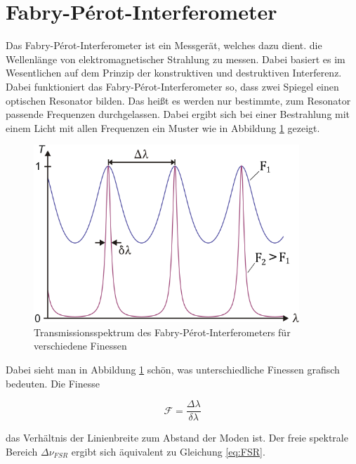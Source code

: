 \section{Fabry-Pérot-Interferometer}
\label{section:Fabry}

Das Fabry-Pérot-Interferometer ist ein Messgerät, welches dazu dient. die Wellenlänge 
von elektromagnetischer Strahlung zu messen. Dabei basiert es im Wesentlichen auf
dem Prinzip der konstruktiven und destruktiven Interferenz. 
Dabei funktioniert das Fabry-Pérot-Interferometer so, dass zwei Spiegel einen optischen
Resonator bilden. Das heißt es werden nur bestimmte, zum Resonator passende Frequenzen durchgelassen. Dabei 
ergibt sich bei einer Bestrahlung mit einem Licht mit allen Frequenzen ein Muster wie in Abbildung
 \ref{bild:Fabry} gezeigt. 

\begin{figure}[ht]
    \centering
    \includegraphics[width = 10cm]{Bilder/Auswertung/Finesse.png}
    \caption{Transmissionsspektrum des Fabry-Pérot-Interferometers für verschiedene Finessen }
    \label{bild:Fabry}
\end{figure}

Dabei sieht man in Abbildung \ref{bild:Fabry} schön, was unterschiedliche Finessen grafisch bedeuten.
Die Finesse 

\begin{equation}
    \mathcal{F} = \frac{\Delta \lambda}{\delta \lambda}
\end{equation}

das Verhältnis der Linienbreite zum Abstand der Moden ist. Der freie 
spektrale Bereich $\Delta \nu_{FSR}$ ergibt sich äquivalent zu Gleichung \ref{eq:FSR}. 